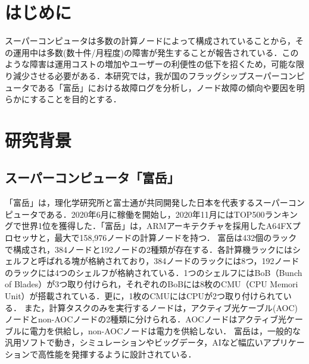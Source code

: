 \documentclass[a4paper,11pt,twocolumn]{jsarticle}
\begin{document}

\section{はじめに}
スーパーコンピュータは多数の計算ノードによって構成されていることから，その運用中は多数(数十件/月程度)の障害が発生することが報告されている\cite{HPC_system_fail}．このような障害は運用コストの増加やユーザーの利便性の低下を招くため，可能な限り減少させる必要がある．本研究では，我が国のフラッグシップスーパーコンピュータである「富岳」における故障ログを分析し，ノード故障の傾向や要因を明らかにすることを目的とする．


\section{研究背景}

\subsection{スーパーコンピュータ「富岳」}\label{sec:fugaku}
「富岳」は，理化学研究所と富士通が共同開発した日本を代表するスーパーコンピュータである．2020年6月に稼働を開始し，2020年11月にはTOP500ランキングで世界1位を獲得した\cite{HPCG}．「富岳」は，ARMアーキテクチャを採用したA64FXプロセッサと，最大で158,976ノードの計算ノードを持つ\cite{Fugaku_Web}．
富岳は432個のラックで構成され，384ノードと192ノードの2種類が存在する．各計算機ラックにはシェルフと呼ばれる塊が格納されており，384ノードのラックには8つ，192ノードのラックには4つのシェルフが格納されている．1つのシェルフにはBoB（Bunch of Blades）が3つ取り付けられ，それぞれのBoBには8枚のCMU（CPU Memori Unit）が搭載されている．更に，1枚のCMUにはCPUが2つ取り付けられている．
また，計算タスクのみを実行するノードは，アクティブ光ケーブル(AOC)ノードとnon-AOCノードの2種類に分けられる．AOCノードはアクティブ光ケーブルに電力を供給し，non-AOCノードは電力を供給しない．
富岳は，一般的な汎用ソフトで動き，シミュレーションやビッグデータ，AIなど幅広いアプリケーションで高性能を発揮するように設計されている．
\end{document}

